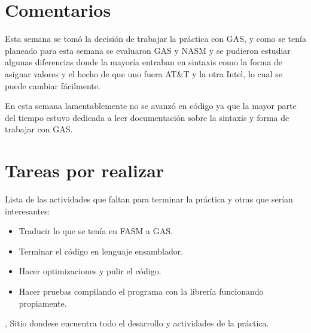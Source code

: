 \documentclass[%
	final,
	notitlepage,
	narroweqnarray,
	inline,
	twoside,
	]{ieee}
\begin{document}
\section{Comentarios}

\PARstart Esta semana se tomó la decisión de trabajar la
práctica con GAS, y como se tenía planeado para esta 
semana se evaluaron GAS y NASM y se pudieron estudiar
algunas diferencias donde la mayoría entraban en sintaxis
como la forma de asignar valores y el hecho de que uno
fuera AT\&T y la otra Intel, lo cual se puede cambiar fácilmente.

En esta semana lamentablemente no se avanzó en código
ya que la mayor parte del tiempo estuvo dedicada a leer
documentación sobre la sintaxis y forma de trabajar con
GAS.


\section{Tareas por realizar}

Lista de las actividades que faltan para terminar la práctica y
otras que serían interesantes:
\begin{itemize}
\item Traducir lo que se tenía en FASM a GAS.
\item Terminar el código en lenguaje ensamblador.
\item Hacer optimizaciones y pulir el código.
\item Hacer pruebas compilando el programa con 
la librería funcionando propiamente.
\end{itemize}



\begin{thebibliography}{1}

,
\newblock Sitio dondese encuentra todo el desarrollo y actividades de la práctica.

\end{thebibliography}

\end{document}

